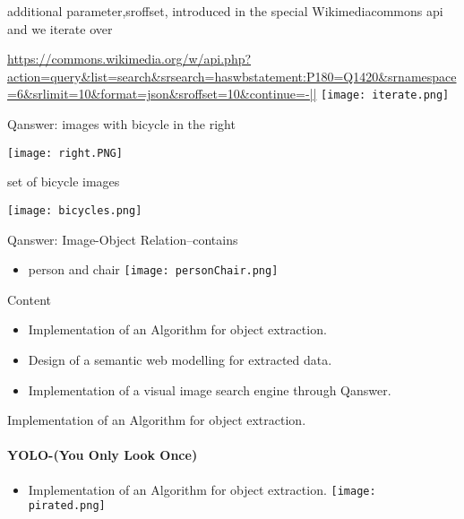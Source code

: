 \documentclass{beamer}
\begin{document}
\begin{frame}{additional parameter,sroffset, introduced in the special Wikimediacommons api and we iterate over}

\url{https://commons.wikimedia.org/w/api.php?action=query&list=search&srsearch=haswbstatement:P180=Q1420&srnamespace=6&srlimit=10&format=json&sroffset=10&continue=-||}
  \texttt{[image: iterate.png]}     


\end{frame}
\begin{frame}{Qanswer: images with bicycle in the right}

       \texttt{[image: right.PNG]}


\end{frame}
\begin{frame}{set of bicycle images}

       \texttt{[image: bicycles.png]}


\end{frame}

\begin{frame}{Qanswer: Image-Object Relation--contains}



  \begin{itemize}
      \item person and chair \texttt{[image: personChair.png]}

  \end{itemize}
 
\end{frame}

\begin{frame}{Content}
\begin{itemize}
\item Implementation of an Algorithm for object extraction. 
\item Design of a semantic web modelling for extracted data.
\item Implementation of a visual image search engine through Qanswer. 

\end{itemize}
\end{frame}

\begin{frame}{Implementation of an Algorithm for object extraction.}
\framesubtitle{YOLO-(You Only Look Once)}
\begin{itemize}
\item Implementation of an Algorithm for object extraction. 
\texttt{[image: pirated.png]}
\end{itemize}
\end{frame}
\end{document}
